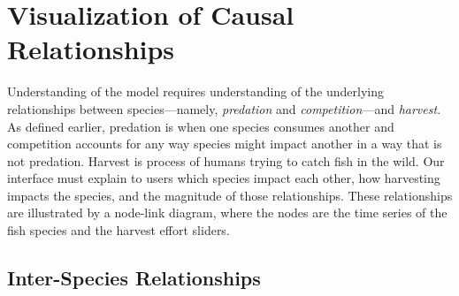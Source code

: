 \section{Visualization of Causal Relationships}

Understanding of the model requires understanding of the underlying relationships between species---namely, \textit{predation} and \textit{competition}---and \textit{harvest}.  As defined earlier, predation is when one species consumes another and competition accounts for any way species might impact another in a way that is not predation.  Harvest is process of humans trying to catch fish in the wild.  Our interface must explain to users which species impact each other, how harvesting impacts the species, and the magnitude of those relationships.  These relationships are illustrated by a node-link diagram, where the nodes are the time series of the fish species and the harvest effort sliders.

\subsection{Inter-Species Relationships}

